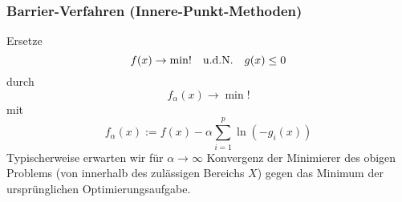 \subsubsection{Barrier-Verfahren (Innere-Punkt-Methoden)}

Ersetze
\[
	f(x) \to \min! \quad\text{u.d.N.}\quad g(x) \le 0
\]
durch
\[
	f_\alpha(x) \to \min!
\]
mit
\[
	f_\alpha(x) := f(x) - \alpha \sum_{i=1}^p \ln( -g_i(x) )
\]
Typischerweise erwarten wir für $\alpha \to \infty$ Konvergenz der Minimierer des obigen Problems (von innerhalb des zulässigen Bereichs $X$) gegen das Minimum der ursprünglichen Optimierungsaufgabe.





